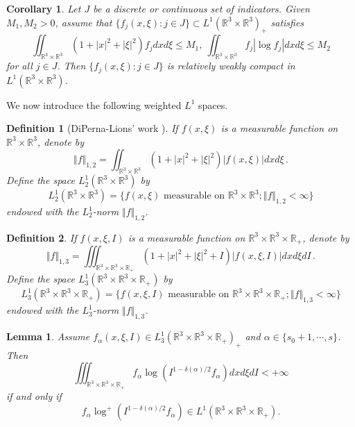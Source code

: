 \documentclass[reqno,11pt]{amsart}
\newtheorem{definition}{Definition}[section]
\newtheorem{corollary}{Corollary}[section]
\newtheorem{lemma}{Lemma}[section]
\numberwithin{equation}{section}
\def\R{\mathbb{R}}
\begin{document}
\begin{corollary}\label{rwc1}
	Let $J$ be a discrete or continuous set of indicators. Given $M_1, M_2 >0$, assume that $\{ f_j (x,\xi):j\in J \} \subset L^1(\R^3 \times \R^3)_+$ satisfies
	\begin{equation*}
		\iint_{\R^3\times \R^3 } (1+|x|^2+|\xi|^2)f_j dx d\xi \leq M_1, \ \iint_{\R^3\times \R^3 } f_j |\log f_j| dxd\xi  \leq M_2
	\end{equation*}
for all $j \in J$. Then $\{f_j(x,\xi):j\in J\}$ is relatively weakly compact in $L^1(\R^3\times \R^3 )$.
\end{corollary}

We now introduce the following weighted $L^1$ spaces.

	\begin{definition}[DiPerna-Lions' work \cite{Diperna-Lions}] \label{def 4.1}
If $f(x,\xi)$ is a measurable function on $\R^3 \times \R^3$, denote by
	\begin{equation*}
		\Vert f \Vert_{1,2} = \iint_{\R^3 \times \R^3 } (1+|x|^2 + |\xi|^2 ) |f (x,\xi)|  dxd\xi \,.
	\end{equation*} 
Define the space $L^1_2(\R^3 \times \R^3 )$ by 
\begin{equation*}
		L^1_2(\R^3 \times \R^3 ) = \{ f (x, \xi) \textrm{ measurable on } \R^3 \times \R^3; \Vert f \Vert_{1,2} < \infty \}
	\end{equation*} 
endowed with the $L^1_2$-norm $ \Vert f \Vert_{1,2} $.
\end{definition}

	\begin{definition} \label{def 4.2}
If $f(x,\xi,I)$ is a measurable function on $\R^3 \times \R^3 \times \R_+$, denote by
	\begin{equation*}
		\Vert f \Vert_{1,3} = \iiint_{\R^3 \times \R^3 \times \R_+ } (1+|x|^2 + |\xi|^2+ I ) |f (x,\xi,I)|  dxd\xi dI \,.
	\end{equation*} 
Define the space $L^1_3(\R^3 \times \R^3 \times \R_+)$ by 
\begin{equation*}
		L^1_3(\R^3 \times \R^3 \times \R_+) = \{ f (x, \xi, I) \textrm{ measurable on } \R^3 \times \R^3 \times \R_+; \Vert f \Vert_{1,3} < \infty \}
	\end{equation*} 
endowed with the $L^1_3$-norm $ \Vert f \Vert_{1,3} $.
\end{definition}

\begin{lemma} \label{Lemma 4.4}
Assume $f_\alpha(x,\xi,I) \in L^1_3 (\R^3 \times \R^3 \times \R_+)_+ $ and $\alpha \in \{s_0+1,\cdots,s\}$. Then
\begin{equation*}
	\iiint_{\R^3 \times \R^3\times \R_+ } f_\alpha \log (I^{1-\delta(\alpha)/2}f_\alpha) dxd\xi dI<+\infty
\end{equation*} 
if and only if 
\begin{equation*}
	f_\alpha \log ^+ (I^{1-\delta(\alpha)/2}f_\alpha) \in L^1(\R^3 \times \R^3 \times \R_+) .
\end{equation*}
\end{lemma}
\end{document}
